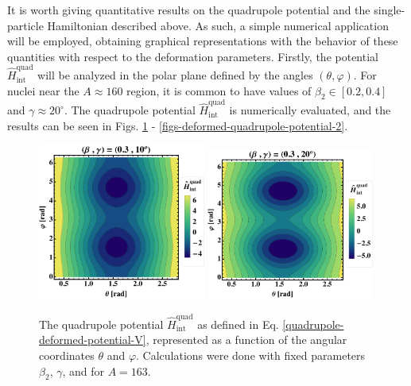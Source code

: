 It is worth giving quantitative results on the quadrupole potential and the single-particle Hamiltonian described above. As such, a simple numerical application will be employed, obtaining graphical representations with the behavior of these quantities with respect to the deformation parameters. Firstly, the potential $\hat{H}_\text{int}^\text{quad}$ will be analyzed in the polar plane defined by the angles $(\theta,\varphi)$. For nuclei near the $A\approx 160$ region, it is common to have values of $\beta_2\in\left[0.2,0.4\right]$ and $\gamma\approx 20^\circ$. %
The quadrupole potential $\hat{H}_\text{int}^\text{quad}$ is numerically evaluated, and the results can be seen in Figs. \ref{figs-deformed-quadrupole-potential-1} - \ref{figs-deformed-quadrupole-potential-2}.
\begin{figure}
    \centering
    \includegraphics[width=0.49\textwidth]{Chapters/Figures/quadrupole-potentialV-1.pdf}
    \includegraphics[width=0.49\textwidth]{Chapters/Figures/quadrupole-potentialV-2.pdf}
    \caption{The quadrupole potential $\hat{H}_\text{int}^\text{quad}$ as defined in Eq. \eqref{quadrupole-deformed-potential-V}, represented as a function of the angular coordinates $\theta$ and $\varphi$. Calculations were done with fixed parameters $\beta_2$, $\gamma$, and for $A=163$.}
    \label{figs-deformed-quadrupole-potential-1}
\end{figure}
